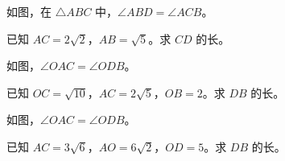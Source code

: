\documentclass{exam-zh}
\begin{document}

\begin{problem}[points=10]
  \noindent
  \begin{minipage}[t]{\dimexpr\linewidth-60mm-6mm\relax}
    \vspace{0pt}
    如图，在 $\triangle ABC$ 中，$\angle ABD=\angle ACB$。

已知 $AC=2\sqrt{2}$，$AB=\sqrt{5}$。求 $CD$ 的长。
    
  \end{minipage}\hfill
  \begin{diagramcoltikz}{60mm}{}
  }
  \end{diagramcoltikz}
  \par\medskip
  \answerarea[54mm]
\end{problem}



\begin{problem}[points=10]
  \noindent
  \begin{minipage}[t]{\dimexpr\linewidth-60mm-6mm\relax}
    \vspace{0pt}
    如图，$\angle OAC=\angle ODB$。

已知 $OC=\sqrt{10}$，$AC=2\sqrt{5}$，$OB=2$。求 $DB$ 的长。
    
  \end{minipage}\hfill
  \begin{diagramcoltikz}{60mm}{}
  }
  \end{diagramcoltikz}
  \par\medskip
  \answerarea[54mm]
\end{problem}



\begin{problem}[points=10]
  \noindent
  \begin{minipage}[t]{\dimexpr\linewidth-60mm-6mm\relax}
    \vspace{0pt}
    如图，$\angle OAC=\angle ODB$。

已知 $AC=3\sqrt{6}$，$AO=6\sqrt{2}$，$OD=5$。求 $DB$ 的长。
    
  \end{minipage}\hfill
  \begin{diagramcoltikz}{60mm}{}
  }
  \end{diagramcoltikz}
  \par\medskip
  \answerarea[54mm]
\end{problem}
\end{document}
